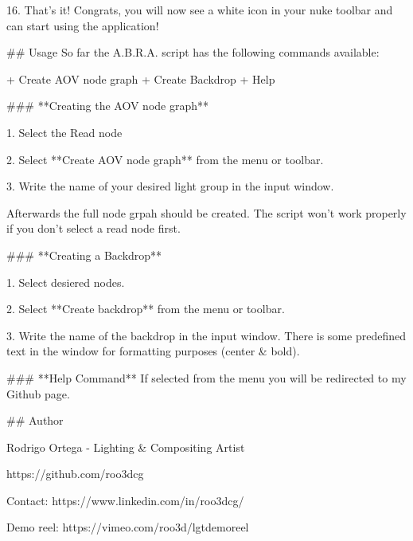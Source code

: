 16. That’s it! Congrats, you will now see a white icon in your nuke toolbar and can start using the application!
    



## Usage
So far the A.B.R.A. script has the following commands available:

+ Create AOV node graph
+ Create Backdrop
+ Help

### **Creating the AOV node graph**

1. Select the Read node

2. Select **Create AOV node graph** from the menu or toolbar.

3. Write the name of your desired light group in the input window.

Afterwards the full node grpah should be created. The script won't work properly if you don't select a read node first.

### **Creating a Backdrop**

1. Select desiered nodes.

2. Select **Create backdrop** from the menu or toolbar.

3. Write the name of the backdrop in the input window. There is some predefined text in the window for formatting purposes (center & bold).

### **Help Command**
If selected from the menu you will be redirected to my Github page.

## Author

Rodrigo Ortega - Lighting & Compositing Artist

https://github.com/roo3dcg

Contact: https://www.linkedin.com/in/roo3dcg/

Demo reel: https://vimeo.com/roo3d/lgtdemoreel
